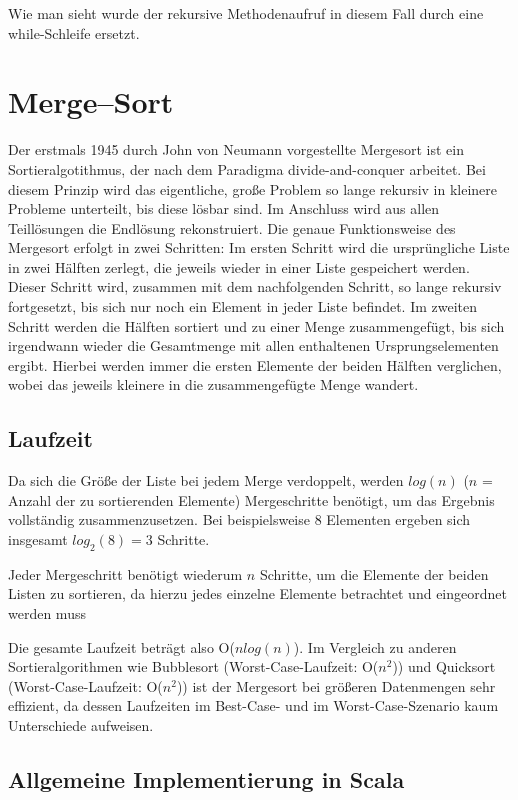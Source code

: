 Wie man sieht wurde der rekursive Methodenaufruf in diesem Fall durch eine while-Schleife ersetzt.


\section{Merge--Sort}
Der erstmals 1945 durch John von Neumann vorgestellte Mergesort ist ein Sortieralgotithmus, der nach dem Paradigma divide-and-conquer arbeitet. Bei diesem Prinzip wird das eigentliche, große Problem so lange rekursiv in kleinere Probleme unterteilt, bis diese lösbar sind. Im Anschluss wird aus allen Teillösungen die Endlösung rekonstruiert. Die genaue Funktionsweise des Mergesort erfolgt in zwei Schritten: Im ersten Schritt wird die ursprüngliche Liste in zwei Hälften zerlegt, die jeweils wieder in einer Liste gespeichert werden. Dieser Schritt wird, zusammen mit dem nachfolgenden Schritt, so lange rekursiv fortgesetzt, bis sich nur noch ein Element in jeder Liste befindet. Im zweiten Schritt werden die Hälften sortiert und zu einer Menge zusammengefügt, bis sich irgendwann wieder die Gesamtmenge mit allen enthaltenen Ursprungselementen ergibt. Hierbei werden immer die ersten Elemente der beiden Hälften verglichen, wobei das jeweils kleinere in die zusammengefügte Menge wandert.


\subsection{Laufzeit}

Da sich die Größe der Liste bei jedem Merge verdoppelt, werden $log(n)$ ($n$ = Anzahl der zu sortierenden Elemente) Mergeschritte benötigt, um das Ergebnis vollständig zusammenzusetzen. Bei beispielsweise 8 Elementen ergeben sich insgesamt $log_2 (8) = 3$ Schritte.

Jeder Mergeschritt benötigt wiederum $n$ Schritte, um die Elemente der beiden Listen zu sortieren, da hierzu jedes einzelne Elemente betrachtet und eingeordnet werden muss

Die gesamte Laufzeit beträgt also O($n log (n) $). Im Vergleich zu anderen Sortieralgorithmen wie Bubblesort (Worst-Case-Laufzeit: O($n^2$)) und Quicksort (Worst-Case-Laufzeit: O($n^2$)) ist der Mergesort bei größeren Datenmengen sehr effizient, da dessen Laufzeiten im Best-Case- und im Worst-Case-Szenario kaum Unterschiede aufweisen.

\subsection{Allgemeine Implementierung in Scala}
